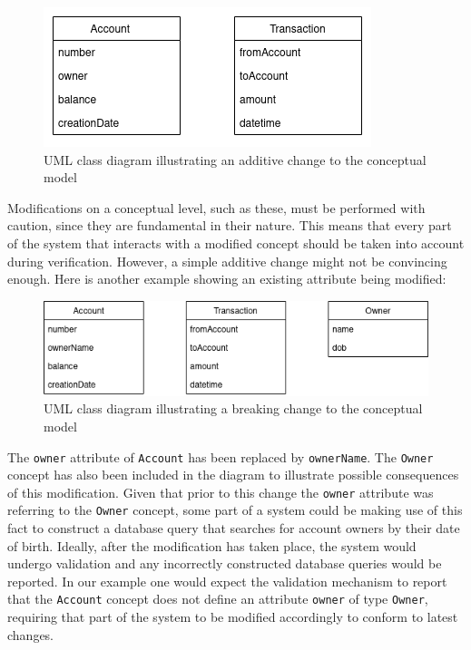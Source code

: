 \begin{figure}[H]\centering
    \includegraphics[scale=0.65]{images/banking1.drawio.png}
    \caption{UML class diagram illustrating an additive change to the conceptual model}\label{fig:bank1}
\end{figure}

\n

Modifications on a conceptual level, such as these, must be performed with caution, since they are fundamental in their nature. This means that every part of the system that interacts with a modified concept should be taken into account during verification. However, a simple additive change might not be convincing enough. Here is another example showing an existing attribute being modified:

\begin{figure}[H]\centering
    \includegraphics[scale=0.65]{images/banking2.drawio.png}
    \caption{UML class diagram illustrating a breaking change to the conceptual model}\label{fig:bank2}
\end{figure}

The \texttt{owner} attribute of \texttt{Account} has been replaced by \texttt{ownerName}. The \texttt{Owner} concept has also been included in the diagram to illustrate possible consequences of this modification. Given that prior to this change the \texttt{owner} attribute was referring to the \texttt{Owner} concept, some part of a system could be making use of this fact to construct a database query that searches for account owners by their date of birth. Ideally, after the modification has taken place, the system would undergo validation and any incorrectly constructed database queries would be reported. In our example one would expect the validation mechanism to report that the \texttt{Account} concept does not define an attribute \texttt{owner} of type \texttt{Owner}, requiring that part of the system to be modified accordingly to conform to latest changes.

